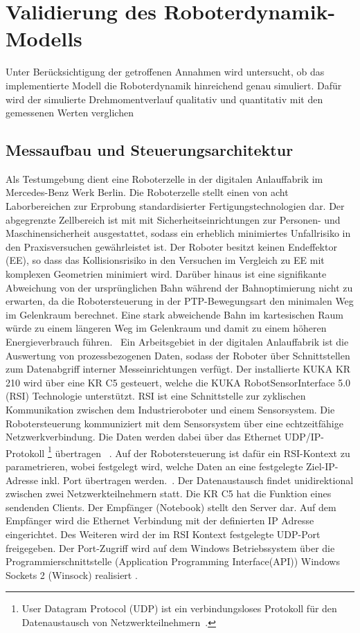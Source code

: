 \chapter{Validierung des Roboterdynamik-Modells}
%
Unter Berücksichtigung der getroffenen Annahmen wird untersucht, ob das implementierte Modell die Roboterdynamik hinreichend genau simuliert. Dafür wird der simulierte Drehmomentverlauf qualitativ und quantitativ mit den gemessenen Werten verglichen
%
\section{Messaufbau und Steuerungsarchitektur}
Als Testumgebung dient eine Roboterzelle in der digitalen Anlauffabrik im Mercedes-Benz Werk Berlin.
Die Roboterzelle stellt einen von acht Laborbereichen zur Erprobung standardisierter Fertigungstechnologien dar.  Der abgegrenzte Zellbereich ist mit mit Sicherheitseinrichtungen zur Personen- und Maschinensicherheit ausgestattet, sodass ein erheblich minimiertes Unfallrisiko in den Praxisversuchen gewährleistet ist. Der Roboter besitzt keinen Endeffektor (EE), so dass das Kollisionsrisiko in den Versuchen im Vergleich zu EE mit komplexen Geometrien minimiert wird. Darüber hinaus ist eine signifikante Abweichung von der ursprünglichen Bahn während der Bahnoptimierung nicht zu erwarten, da die Robotersteuerung in der PTP-Bewegungsart den minimalen Weg im Gelenkraum berechnet. Eine stark abweichende Bahn im kartesischen Raum würde zu einem längeren Weg im Gelenkraum und damit zu einem höheren Energieverbrauch führen.~\cite[S.~59]{Eggers.2019}
%
Ein Arbeitsgebiet in der digitalen Anlauffabrik ist die Auswertung von prozessbezogenen Daten, sodass der Roboter über Schnittstellen zum Datenabgriff interner Messeinrichtungen verfügt. Der installierte KUKA KR 210 wird über eine KR C5 gesteuert, welche die KUKA RobotSensorInterface 5.0 (RSI) Technologie unterstützt. RSI ist eine Schnittstelle zur zyklischen Kommunikation zwischen dem Industrieroboter und einem Sensorsystem. Die Robotersteuerung kommuniziert mit dem Sensorsystem über eine echtzeitfähige Netzwerkverbindung. Die Daten werden dabei über das Ethernet UDP/IP-Protokoll \footnote{User Datagram Protocol (UDP) ist ein verbindungsloses Protokoll für den Datenaustausch von Netzwerkteilnehmern~\cite{RSI.2020}.} übertragen ~\cite[S.~11]{RSI.2020}. 
Auf der Robotersteuerung ist daf{\"u}r ein RSI-Kontext zu parametrieren, wobei festgelegt wird, welche Daten an eine festgelegte Ziel-IP-Adresse inkl. Port {\"u}bertragen werden.~\cite[S.~43]{RSI.2020}.  Der Datenaustausch findet unidirektional zwischen zwei Netzwerkteilnehmern statt. Die KR C5 hat die Funktion eines sendenden Clients. Der Empfänger (Notebook) stellt den Server dar. Auf dem Empfänger wird die Ethernet Verbindung mit der definierten IP Adresse eingerichtet. Des Weiteren wird der im RSI Kontext festgelegte UDP-Port freigegeben. Der Port-Zugriff wird auf dem Windows Betriebssystem über die Programmierschnittstelle (Application Programming Interface(API)) Windows Sockets 2 (Winsock) realisiert \cite{Winsock.2023}. 
